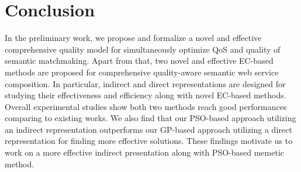 \section{Conclusion}\label{summary2}
In the preliminary work, we propose and formalize a novel and effective comprehensive quality model for simultaneously optimize QoS and quality of semantic matchmaking. Apart from that, two novel and effective EC-based methods are proposed for comprehensive quality-aware semantic web service composition. In particular, indirect and direct representations are designed for studying their effectiveness and efficiency along with novel EC-based methods. Overall experimental studies show both two methods reach good performances comparing to existing works. We also find that our PSO-based approach utilizing an indirect representation outperforms our GP-based approach utilizing a direct representation for finding more effective solutions. These findings motivate us to work on a more effective indirect presentation along with PSO-based memetic method.
